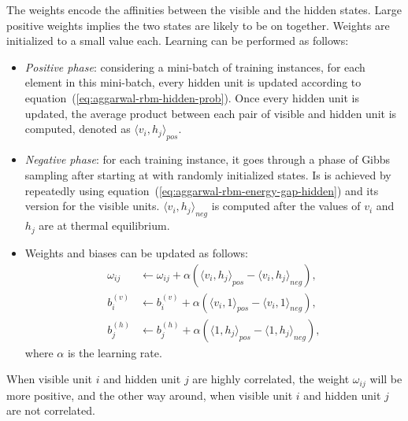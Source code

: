 The weights encode the affinities between the visible and the hidden states.
Large positive weights implies the two states are likely to be on together.
Weights are initialized to a small value each.
Learning can be performed as follows:
\begin{itemize}
    \item \textit{Positive phase}: considering a mini-batch of training instances, for each element in this mini-batch, every hidden unit is updated according to equation~(\ref{eq:aggarwal-rbm-hidden-prob}).
    Once every hidden unit is updated, the average product between each pair of visible and hidden unit is computed, denoted as ${\langle v_{i}, h_{j} \rangle}_{pos}$.
    
    \item \textit{Negative phase}: for each training instance, it goes through a phase of Gibbs sampling after starting at with randomly initialized states.
    Is is achieved by repeatedly using equation~(\ref{eq:aggarwal-rbm-energy-gap-hidden}) and its version for the visible units.
    ${\langle v_{i}, h_{j} \rangle}_{neg}$ is computed after the values of $v_{i}$ and $h_{j}$ are at thermal equilibrium.
    
    \item Weights and biases can be updated as follows:
    \begin{equation}
        \label{eq:aggarwal-weights-bias-update}
        \begin{split}
            \omega_{ij} &\leftarrow \omega_{ij} + \alpha ({\langle v_{i}, h_{j} \rangle}_{pos} - {\langle v_{i}, h_{j} \rangle}_{neg}), \\
            b^{(v)}_{i} &\leftarrow b^{(v)}_{i} + \alpha ({\langle v_{i}, 1 \rangle}_{pos} - {\langle v_{i}, 1 \rangle}_{neg}), \\
            b^{(h)}_{j} &\leftarrow  b^{(h)}_{j} + \alpha ({\langle 1, h_{j} \rangle}_{pos} - {\langle 1, h_{j} \rangle}_{neg}), 
        \end{split}
    \end{equation}
    where $\alpha$ is the learning rate.
\end{itemize}

When visible unit $i$ and hidden unit $j$ are highly correlated, the weight $\omega_{ij}$ will be more positive, and the other way around, when visible unit $i$ and hidden unit $j$ are not correlated.


